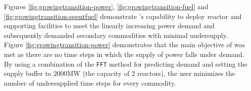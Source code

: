     \begin{table}[]
        \end{table}

Figures \ref{fig:growingtransition-power}, \ref{fig:growingtransition-fuel}
and \ref{fig:growingtransition-spentfuel} demonstrate \deploy's capability 
to deploy reactor and supporting facilities to meet the linearly increasing
power demand and subsequently demanded secondary commodities with 
minimal undersupply.
Figure \ref{fig:growingtransition-power} demonstrates that
the main objective of \deploy was met as
there are no time steps
in which the supply of power falls under demand.
By using a combination of the \texttt{FFT} method for 
predicting demand and setting the supply buffer to 2000MW 
(the capacity of 2 reactors), the user minimizes the number of 
undersupplied time steps for every commodity.

